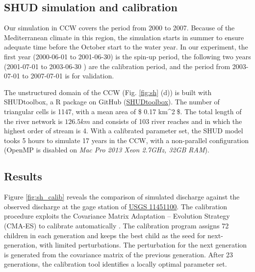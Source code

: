 \documentclass[]{scrbook}
\begin{document}
\subsection{SHUD simulation and
calibration}\label{shud-simulation-and-calibration}

Our simulation in CCW covers the period from 2000 to 2007. Because of
the Mediterranean climate in this region, the simulation starts in
summer to ensure adequate time before the October start to the water
year. In our experiment, the first year (2000-06-01 to 2001-06-30) is
the spin-up period, the following two years (2001-07-01 to 2003-06-30 )
are the calibration period, and the period from 2003-07-01 to 2007-07-01
is for validation.

The unstructured domain of the CCW (Fig. \ref{fig:sh} (d)) is built with
SHUDtoolbox, a R package on GitHub
(\href{https://github.com/shud-system/SHUDtoolbox}{SHUDtoolbox}). The
number of triangular cells is 1147, with a mean area of \$ 0.17
km\^{}2\$. The total length of the river network is \(126.5 km\) and
consists of 103 river reaches and in which the highest order of stream
is 4. With a calibrated parameter set, the SHUD model tooks 5 hours to
simulate 17 years in the CCW, with a non-parallel configuration (OpenMP
is disabled on \emph{Mac Pro 2013 Xeon 2.7GHz, 32GB RAM}).

\subsection{Results}\label{results}

Figure \ref{fig:sh_calib} reveals the comparison of simulated discharge
against the observed discharge at the gage station of
\href{https://waterdata.usgs.gov/ca/nwis/uv/?site_no=11451100}{USGS
11451100}. The calibration procedure exploits the Covariance Matrix
Adaptation -- Evolution Strategy (CMA-ES) to calibrate automatically
\citep{Hansen2016}. The calibration program assigns 72 children in each
generation and keeps the best child as the seed for next-generation,
with limited perturbations. The perturbation for the next generation is
generated from the covariance matrix of the previous generation. After
23 generations, the calibration tool identifies a locally optimal
parameter set.
\end{document}

